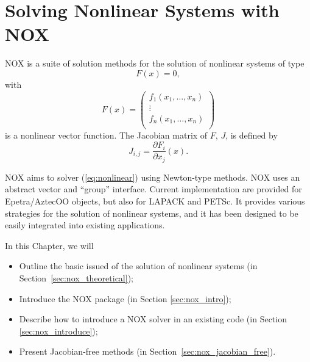 % 
% 
% 
%   
%   
% 
% 

\section{Solving Nonlinear Systems with NOX}
\label{chap:nox}

NOX is a suite of solution methods for the solution of nonlinear
systems of type
\begin{equation}
\label{eq:nonlinear}
F(x) = 0,
\end{equation}
with
\[
F(x) = 
\begin{pmatrix}
  f_1(x_1, \ldots, x_n) \\
  \vdots \\
  f_n(x_1, \ldots, x_n) \\
\end{pmatrix}
\]
is a nonlinear vector function. The Jacobian matrix of $F$, $J$, is
defined by
\[
J_{i,j} = \frac{ \partial F_i}{\partial x_j} (x).
\]

NOX aims to solver (\ref{eq:nonlinear}) using Newton-type methods. NOX
uses an abstract vector and ``group'' interface. Current implementation
are provided for Epetra/AztecOO objects, but also for LAPACK and PETSc.
It provides various strategies for the solution of nonlinear systems,
and it has been designed to be easily integrated into existing
applications.

In this Chapter, we will
\begin{itemize}
\item Outline the basic issued of the  solution of nonlinear
  systems (in Section~\ref{sec:nox_theoretical});
\item Introduce the NOX package (in Section \ref{sec:nox_intro});
\item Describe how to introduce a NOX solver in an existing code (in
  Section \ref{sec:nox_introduce});
\item Present Jacobian-free methods (in
  Section~\ref{sec:nox_jacobian_free}).
\end{itemize}

